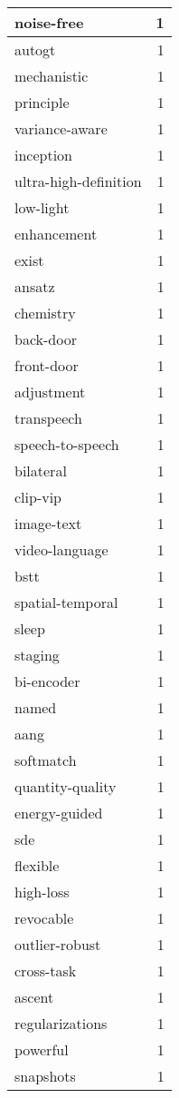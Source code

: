 \begin{table}[h]
\begin{tabular}{|l|r|}
\hline
noise-free & 1 \\
\hline
autogt & 1 \\
\hline
mechanistic & 1 \\
\hline
principle & 1 \\
\hline
variance-aware & 1 \\
\hline
inception & 1 \\
\hline
ultra-high-definition & 1 \\
\hline
low-light & 1 \\
\hline
enhancement & 1 \\
\hline
exist & 1 \\
\hline
ansatz & 1 \\
\hline
chemistry & 1 \\
\hline
back-door & 1 \\
\hline
front-door & 1 \\
\hline
adjustment & 1 \\
\hline
transpeech & 1 \\
\hline
speech-to-speech & 1 \\
\hline
bilateral & 1 \\
\hline
clip-vip & 1 \\
\hline
image-text & 1 \\
\hline
video-language & 1 \\
\hline
bstt & 1 \\
\hline
spatial-temporal & 1 \\
\hline
sleep & 1 \\
\hline
staging & 1 \\
\hline
bi-encoder & 1 \\
\hline
named & 1 \\
\hline
aang & 1 \\
\hline
softmatch & 1 \\
\hline
quantity-quality & 1 \\
\hline
energy-guided & 1 \\
\hline
sde & 1 \\
\hline
flexible & 1 \\
\hline
high-loss & 1 \\
\hline
revocable & 1 \\
\hline
outlier-robust & 1 \\
\hline
cross-task & 1 \\
\hline
ascent & 1 \\
\hline
regularizations & 1 \\
\hline
powerful & 1 \\
\hline
snapshots & 1 \\

\end{tabular}
\end{table}
